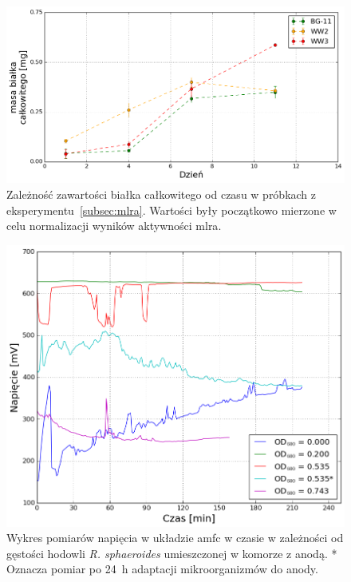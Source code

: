 \vspace{\fill}

\newpage
\thispagestyle{empty}

\begin{figure}
    \centering
    \includegraphics[width=12.5cm]{figures/totalprot}
    \caption{
        Zależność zawartości białka całkowitego od czasu w próbkach
        z eksperymentu~\ref{subsec:mlra}. Wartości były początkowo
        mierzone w celu normalizacji wyników aktywności \acrshort{mlra}.
    }
    \label{fig:6}
\end{figure}

\begin{figure}
    \label{fig:7}
    \centering
    \includegraphics[width=12.5cm]{figures/voltage1}
    \caption{
        Wykres pomiarów napięcia w układzie \acrshort{amfc}
        w czasie w zależności od gęstości hodowli
        \textit{R. sphaeroides} umieszczonej w komorze z anodą.
        * Oznacza pomiar po 24~h adaptacji mikroorganizmów
        do anody.
    }
\end{figure}
